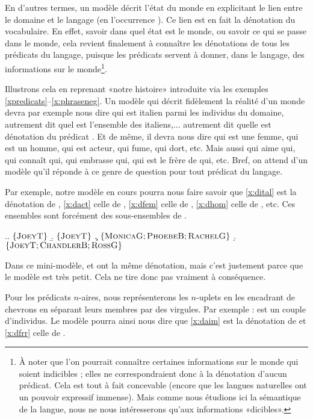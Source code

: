 En d'autres termes, un modèle décrit l'état du monde en explicitant le
lien entre le 
domaine et le langage (en l'occurrence {\LO}).  Ce lien est en fait la
dénotation du vocabulaire.
En effet, savoir dans quel état est le monde, ou savoir ce qui se passe dans le
monde, cela revient finalement à connaître les dénotations de tous les
prédicats du langage, puisque les prédicats servent à donner, dans le
langage, des informations sur le monde\footnote{À noter que l'on pourrait connaître
  certaines informations sur le monde qui soient indicibles ; elles ne
  correspondraient donc à la dénotation d'aucun prédicat.  Cela est
  tout à fait concevable (encore que les langues naturelles ont un
  pouvoir expressif immense).  Mais comme nous étudions ici la sémantique
  de la langue, nous ne nous intéresserons qu'aux informations
  «dicibles».}. 

Illustrons cela en reprenant «notre histoire» introduite via les
exemples \ref{xpredicats}--\ref{x:phraseneg}.
Un modèle qui décrit fidèlement la réalité d'un monde devra par
exemple nous dire qui est italien parmi les individus du domaine,
autrement dit quel est l'ensemble des italiens,... autrement dit quelle
est dénotation du prédicat .  Et de même, il devra nous
dire qui est une femme, qui est un homme, qui est acteur, qui fume,
qui dort, etc.  Mais aussi qui aime qui, qui connaît qui, qui embrasse
qui, qui est le frère de qui, etc.  Bref, on attend d'un modèle qu'il
réponde à ce genre de question pour tout prédicat du langage. 

Par exemple, notre modèle en cours pourra nous faire savoir que
\ref{x:dital} est la dénotation de , \ref{x:dact}
celle de , \ref{x:dfem} celle de , \ref{x:dhom}
celle de , etc.  Ces ensembles sont forcément des
sous-ensembles de .

\ex.\a. \(\{ \textsc{JoeyT} \}\) \label{x:dital}
\b. \(\{ \textsc{JoeyT} \}\) \label{x:dact}
\c. \(\{ \textsc{MonicaG};\textsc{PhoebeB};\textsc{RachelG} \}\) \label{x:dfem}
\d. \(\{ \textsc{JoeyT};\textsc{ChandlerB};\textsc{RossG} \}\) \label{x:dhom}


Dans ce mini-modèle,  et  ont la même
dénotation, mais c'est justement parce que le modèle est très petit.
Cela ne tire donc pas vraiment à conséquence.

Pour les prédicats $n$-aires, nous représenterons les $n$-uplets
en les encadrant de chevrons \tuple{\,} en séparant leurs membres par des
virgules. 
\sloppy  Par exemple :  est un
couple d'individus. Le modèle pourra ainsi nous dire que
\ref{x:daim} est la dénotation de  et \ref{x:dfrr} celle
de .


